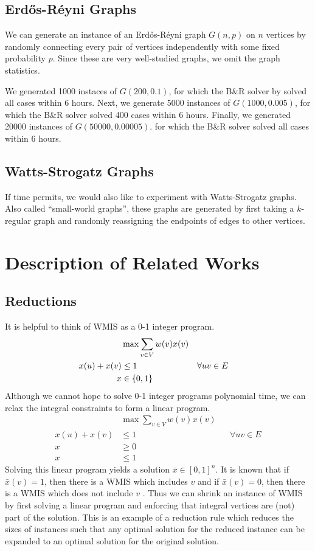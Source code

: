 \documentclass{article}
\DeclarePairedDelimiter{\set}{\lbrace}{\rbrace}
\begin{document}
\subsection{Erd\H os-R\'eyni Graphs}
We can generate an instance of an Erd\H os-R\'eyni graph $G(n, p)$ on $n$ vertices
by randomly connecting every pair of vertices independently
with some fixed probability $p$.
Since these are very well-studied graphs,
we omit the graph statistics.

We generated 1000 instaces of $G(200, 0.1)$,
for which the B\&R solver by \citet{kamis} solved all cases within 6 hours.
Next, we generate 5000 instances of $G(1000, 0.005)$,
for which the B\&R solver solved 400 cases within 6 hours.
Finally, we generated 20000 instances of $G(50000, 0.00005)$.
for which the B\&R solver solved all cases within 6 hours.

\subsection{Watts-Strogatz Graphs}
If time permits, we would also like to experiment with Watts-Strogatz graphs.
Also called ``small-world graphs'',
these graphs are generated by first taking a $k$-regular graph
and randomly reassigning the endpoints of edges to other vertices.

\section{Description of Related Works}
\subsection{Reductions}
It is helpful to think of WMIS as a 0-1 integer program.
\begin{align*}
  &\max \sum_{v\in V} w(v) x(v) \\
  x(u) + x(v) &\leq 1 &&\forall uv\in E \\
  x &\in \set{0, 1}
\end{align*}
Although we cannot hope to solve 0-1 integer programs polynomial time,
we can relax the integral constraints to form a linear program.
\begin{align*}
  &\max \sum_{v\in V} w(v) x(v) \\
  x(u) + x(v) &\leq 1 &&\forall uv\in E \\
  x &\geq 0 \\
  x &\leq 1
\end{align*}
Solving this linear program yields a solution $\bar x\in [0, 1]^n$.
It is known that if $\bar x(v) = 1$,
then there is a WMIS which includes $v$
and if $\bar x(v) = 0$,
then there is a WMIS which does not include $v$ \citet{lpreduction}.
Thus we can shrink an instance of WMIS by first solving a linear program
and enforcing that integral vertices are (not) part of the solution.
This is an example of a reduction rule which reduces the sizes of instances
such that any optimal solution for the reduced instance can be expanded to an optimal solution
for the original solution.
\end{document}
